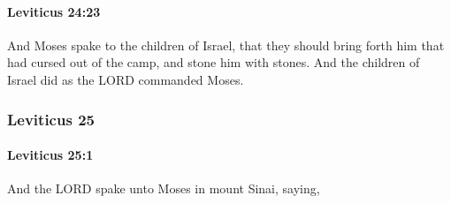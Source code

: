 		\paragraph{Leviticus 24:23} %
			\label{LEVITICUS-24-23}

			And Moses spake to the children of Israel, that they should bring forth him that had cursed out of the camp, and stone him with stones. And the children of Israel did as the LORD commanded Moses.

	\subsubsection{Leviticus 25} %
		\label{LEVITICUS-25}

		\paragraph{Leviticus 25:1} %
			\label{LEVITICUS-25-1}

			And the LORD spake unto Moses in mount Sinai, saying,

